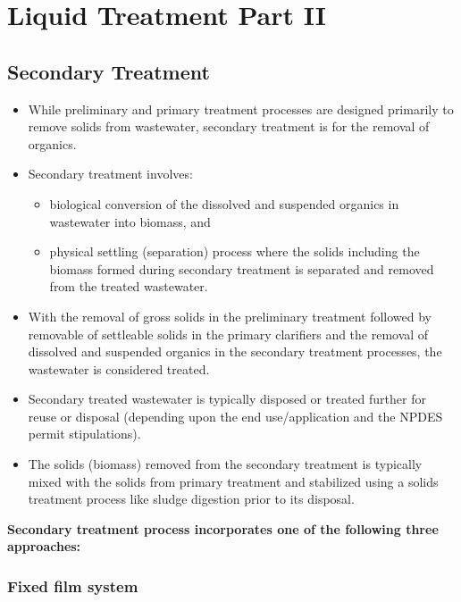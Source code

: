 
\chapter{Liquid Treatment Part II}

\section{Secondary Treatment}
\begin{itemize}
\item While preliminary and primary treatment processes are designed primarily to remove solids from wastewater, secondary treatment is for the removal of organics.
\item Secondary treatment involves:
\begin{itemize}
\item biological conversion of the dissolved and suspended organics in wastewater into biomass, and
\item physical settling (separation) process where the solids including the biomass formed during secondary treatment is separated and removed from the treated wastewater.
\end{itemize}

\item With the removal of gross solids in the preliminary treatment followed by removable of settleable solids in the primary clarifiers and the removal of dissolved and suspended organics in the secondary treatment processes, the wastewater is considered treated.
\item Secondary treated wastewater is typically disposed or treated further for reuse or disposal (depending upon the end use/application and the NPDES permit stipulations).
\item The solids (biomass) removed from the secondary treatment is typically mixed with the solids from primary treatment and stabilized using a solids treatment process like sludge digestion prior to its disposal.
\end{itemize}
\vspace{1cm}

\textbf{Secondary treatment process incorporates one of the following three approaches:}


\subsection{Fixed film system}	
		
